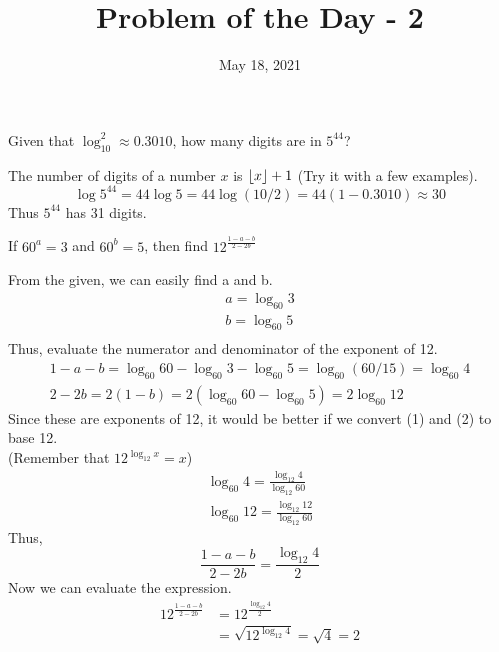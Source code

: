 \documentclass[answers]{exam}
\title{Problem of the Day - 2}
\date{May 18, 2021}
\DeclarePairedDelimiter\floor{\lfloor}{\rfloor}
\begin{document}
	\maketitle
	\begin{questions}
		\question
		Given that $\log_{10}^2 \approx 0.3010$, how many digits are in $5^{44}$?
		
		\begin{solution}
			The number of digits of a number $x$ is $\floor*{x} + 1$ (Try it with a few examples).
			\begin{equation*}
			\log 5^{44} = 44 \log 5 = 44 \log (10/2) = 44(1 - 0.3010) \approx 30
			\end{equation*}
			Thus $5^{44}$ has 31 digits.
		\end{solution}
	
		\question
		If $60^a = 3$ and $60^b = 5$, then find $12^{\frac{1 - a - b}{2-2b}}$
		
		\begin{solution}
			From the given, we can easily find a and b.
			\begin{gather*}
			a = \log_{60} 3 \\
			b = \log_{60} 5 \\
			\end{gather*}
			Thus, evaluate the numerator and denominator of the exponent of 12.
			\begin{gather}
			1 - a - b = \log_{60}60 - \log_{60} 3 - \log_{60} 5 = \log_{60}(60 / 15) = \log_{60} 4 \\
			2 - 2b = 2(1 - b) = 2\left (\log_{60}60 - \log_{60}5 \right) = 2\log_{60} 12
			\end{gather}
			Since these are exponents of 12, it would be better if we convert (1) and (2) to base 12. \\
			(Remember that $12^{\log_{12}x} = x$)
			\begin{gather*}
			\log_{60} 4 = \frac{\log_{12} 4}{\log_{12} 60} \\
			\log_{60} 12 = \frac{\log_{12} 12}{\log_{12} 60}
			\end{gather*}
			Thus,
			\begin{equation*}
			\frac{1 - a - b}{2 - 2b} = \frac{\log_{12} 4}{2}
			\end{equation*}
			Now we can evaluate the expression.
			\begin{align*}
			12^{\frac{1 - a - b}{2 - 2b}} &= 12^{\frac{\log_{12} 4}{2}} \\
			&= \sqrt{12^{\log_{12} 4}} = \sqrt{4} = 2
			\end{align*}
		\end{solution} 
	\end{questions}
\end{document}
